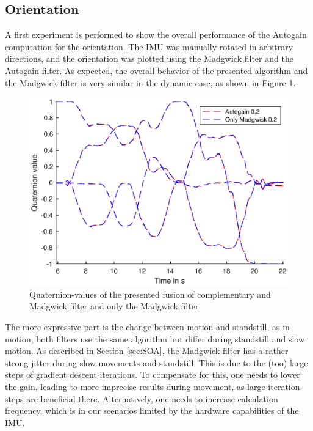 \documentclass[letterpaper, 10 pt, conference]{ieeeconf}  %
\begin{document}
\subsection{Orientation}
A first experiment is performed to show the overall performance of the Autogain computation for the orientation. The IMU was manually rotated in arbitrary directions, and the orientation was plotted using the Madgwick filter and the Autogain filter.
As expected, the overall behavior of the presented algorithm and the Madgwick filter is very similar in the dynamic case, as shown in Figure \ref{quaternion1}.
\begin{figure}
\includegraphics[width=\linewidth]{./graphics/AutoVsMad.eps}
\caption{Quaternion-values of the presented fusion of complementary and Madgwick filter and only the Madgwick filter.}
\label{quaternion1}
\end{figure}
The more expressive part is the change between motion and standstill, as in motion, both filters use the same algorithm but differ during standstill and slow motion.
As described in Section \ref{sec:SOA}, the Madgwick filter has a rather strong jitter during slow movements and standstill. 
This is due to the (too) large steps of gradient descent iterations.
To compensate for this, one needs to lower the gain, leading to more imprecise results during movement, as large iteration steps are beneficial there.
Alternatively, one needs to increase calculation frequency, which is in our scenarios limited by the hardware capabilities of the IMU.
\end{document}
